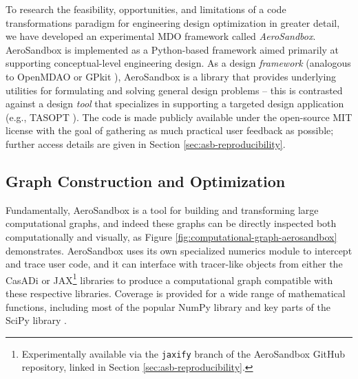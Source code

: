 To research the feasibility, opportunities, and limitations of a code transformations paradigm for engineering design optimization in greater detail, we have developed an experimental MDO framework called \emph{AeroSandbox}. AeroSandbox is implemented as a Python-based framework aimed primarily at supporting conceptual-level engineering design. As a design \emph{framework} (analogous to OpenMDAO \cite{gray_openmdao_2019} or GPkit \cite{gpkit}), AeroSandbox is a library that provides underlying utilities for formulating and solving general design problems -- this is contrasted against a design \emph{tool} that specializes in supporting a targeted design application (e.g., TASOPT \cite{drela_tasopt_2010}). The code is made publicly available under the open-source MIT license with the goal of gathering as much practical user feedback as possible; further access details are given in Section \ref{sec:asb-reproducibility}.

\subsection{Graph Construction and Optimization}

Fundamentally, AeroSandbox is a tool for building and transforming large computational graphs, and indeed these graphs can be directly inspected both computationally and visually, as Figure \ref{fig:computational-graph-aerosandbox} demonstrates. AeroSandbox uses its own specialized numerics module to intercept and trace user code, and it can interface with tracer-like objects from either the CasADi \cite{casadi} or JAX\footnote{Experimentally available via the \texttt{jaxify} branch of the AeroSandbox GitHub repository, linked in Section \ref{sec:asb-reproducibility}.} \cite{jax} libraries to produce a computational graph compatible with these respective libraries. Coverage is provided for a wide range of mathematical functions, including most of the popular NumPy library \cite{harris_array_2020} and key parts of the SciPy library \cite{scipy}.

